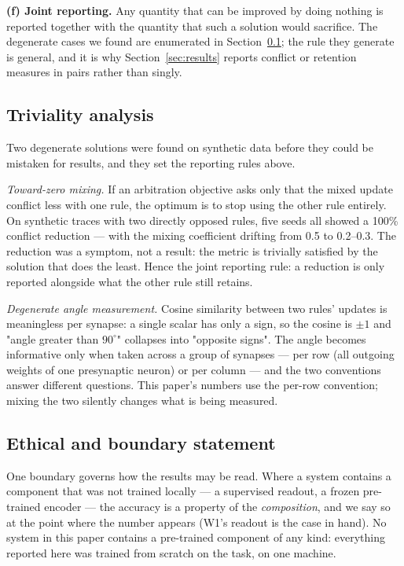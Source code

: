 \documentclass[11pt]{article}
\begin{document}
\textbf{(f) Joint reporting.} Any quantity that can be improved by doing nothing
is reported together with the quantity that such a solution would sacrifice. The
degenerate cases we found are enumerated in Section~\ref{sec:triviality}; the
rule they generate is general, and it is why Section~\ref{sec:results} reports
conflict or retention measures in pairs rather than singly.

\subsection{Triviality analysis}
\label{sec:triviality}
Two degenerate solutions were found on synthetic data before they could be
mistaken for results, and they set the reporting rules above.

\emph{Toward-zero mixing.} If an arbitration objective asks only that the mixed
update conflict less with one rule, the optimum is to stop using the other rule
entirely. On synthetic traces with two directly opposed rules, five seeds all
showed a 100\% conflict reduction --- with the mixing coefficient drifting from
0.5 to 0.2--0.3. The reduction was a symptom, not a result: the metric is
trivially satisfied by the solution that does the least. Hence the joint
reporting rule: a reduction is only reported alongside what the other rule still
retains.

\emph{Degenerate angle measurement.} Cosine similarity between two rules'
updates is meaningless per synapse: a single scalar has only a sign, so the
cosine is $\pm 1$ and "angle greater than $90^\circ$" collapses into "opposite
signs". The angle becomes informative only when taken across a group of
synapses --- per row (all outgoing weights of one presynaptic neuron) or per
column --- and the two conventions answer different questions. This paper's
numbers use the per-row convention; mixing the two silently changes what is
being measured.

\subsection{Ethical and boundary statement}
One boundary governs how the results may be read. Where a system contains a
component that was not trained locally --- a supervised readout, a frozen
pre-trained encoder --- the accuracy is a property of the \emph{composition},
and we say so at the point where the number appears (W1's readout is the case in
hand). No system in this paper contains a pre-trained component of any kind:
everything reported here was trained from scratch on the task, on one machine.
\end{document}
